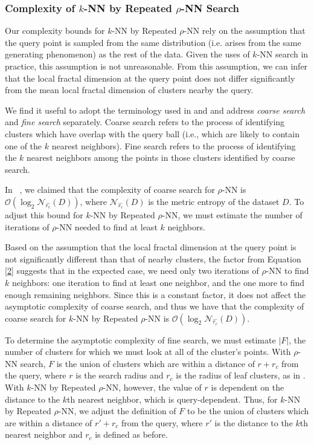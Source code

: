 \subsubsection{Complexity of $k$-NN by Repeated $\rho$-NN Search}
\label{paragraph:methods:repeated-rnn-complexity}

Our complexity bounds for $k$-NN by Repeated $\rho$-NN rely on the assumption that the query point is sampled from the same distribution
(i.e. arises from the same generating phenomenon) as the rest of the data. Given the uses of $k$-NN search in practice, 
this assumption is not unreasonable. From this assumption, we can infer that the local fractal dimension
at the query point does not differ significantly from the mean local fractal dimension of clusters nearby the query.

We find it useful to adopt the terminology used in 
\cite{ishaq2019clustered} and \cite{yu2015entropy} and address \emph{coarse search} and \emph{fine search} separately. 
Coarse search refers to the process of identifying clusters
which have overlap with the query ball (i.e., which are likely to contain one of the $k$ nearest neighbors). 
Fine search refers to the process
of identifying the $k$ nearest neighbors among the points in those clusters identified by coarse search.

In ~\cite{ishaq2019clustered}, we claimed that the complexity of coarse search for $\rho$-NN is $\mathcal{O}(\log_2\mathcal{N}_{\hat{r_c}}(D))$, 
where $\mathcal{N}_{\hat{r_c}}(D)$ is the metric entropy of the dataset $D$. 
To adjust this bound for $k$-NN by Repeated $\rho$-NN, we must estimate the number of iterations 
of $\rho$-NN needed to find at least $k$ neighbors. 
    

Based on the assumption that the local fractal dimension at the query point is not significantly different than that of 
nearby clusters, the factor from Equation \ref{2} suggests that in the expected case, we need only two iterations of 
$\rho$-NN to find $k$ neighbors: one iteration to find at least one neighbor, and the one more to find enough remaining neighbors.
Since this is a constant factor, it does not affect the asymptotic complexity of coarse search, and thus we have that 
the complexity of coarse search for $k$-NN by Repeated $\rho$-NN is $\mathcal{O}(\log_2\mathcal{N}_{\hat{r_c}}(D))$.

To determine the asymptotic complexity of fine search, we must estimate $|F|$, the 
number of clusters for which we must look at all of the cluster's points. With $\rho$-NN 
search, $F$ is the union of clusters which are within a distance of $r + r_c$ from the query,
where $r$ is the search radius and $r_c$ is the radius of leaf clusters,
as in \cite{yu2015entropy}. With $k$-NN by Repeated $\rho$-NN, however, 
the value of $r$ is dependent on the distance to the $k$th nearest neighbor, which 
is query-dependent. Thus, for $k$-NN by Repeated $\rho$-NN, we adjust the definition of 
$F$ to be the union of clusters which are within a distance of $r' + r_c$ from the query, 
where $r'$ is the distance to the $k$th nearest neighbor and $r_c$ is defined as before.

